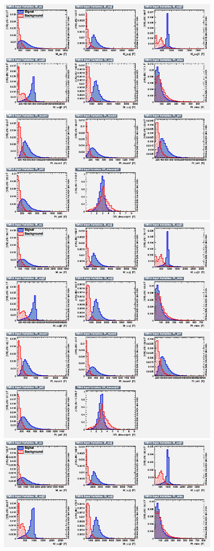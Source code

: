 \begin{figure}[H]
    \centering
    {\includegraphics[width=.49\textwidth]{Images/Analysis/Results_LQToBMu_pair_uubj_BDTG_FullRun2_2023_01_25_020318/800/variables_id_c1.png}}
    {\includegraphics[width=.49\textwidth]{Images/Analysis/Results_LQToBMu_pair_uubj_BDTG_FullRun2_2023_01_25_020318/800/variables_id_c2.png}}
    {\includegraphics[width=.49\textwidth]{Images/Analysis/Results_LQToBMu_pair_uubj_BDTG_FullRun2_2023_01_25_020318/900/variables_id_c1.png}}
    {\includegraphics[width=.49\textwidth]{Images/Analysis/Results_LQToBMu_pair_uubj_BDTG_FullRun2_2023_01_25_020318/900/variables_id_c2.png}}
    {\includegraphics[width=.49\textwidth]{Images/Analysis/Results_LQToBMu_pair_uubj_BDTG_FullRun2_2023_01_25_020318/1000/variables_id_c1.png}}

\end{figure}
